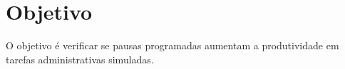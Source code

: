 \section{Objetivo}
O objetivo é verificar se pausas programadas aumentam a produtividade em tarefas administrativas simuladas.
